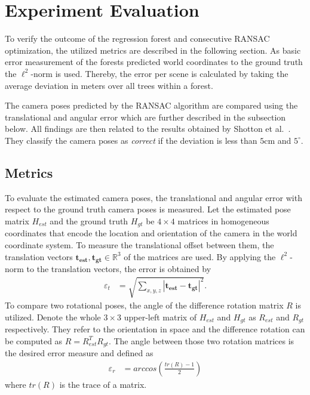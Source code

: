 \documentclass[final]{cvpr}
\begin{document}
\section{Experiment Evaluation} \label{sec:eval}
To verify the outcome of the regression forest and consecutive RANSAC optimization, the utilized metrics are described
in the following section. As basic error measurement of the forests predicted world coordinates to the ground truth the 
$\ell^2$-norm is used. Thereby, the error per scene is calculated by taking the average deviation in meters 
over all trees within a forest. 

The camera poses predicted by the RANSAC algorithm are compared using the translational and angular error 
which are further described in the subsection below. All findings are then related to the results obtained by 
Shotton et al.~\cite{shotton2013}. They classify the camera poses as \textit{correct} if the deviation is less
than $5$cm and $5^\circ$. 


\subsection{Metrics} \label{subsec:metrics}
To evaluate the estimated camera poses, the translational and angular error with respect to the 
ground truth camera poses is measured. Let the estimated pose matrix $H_{est}$ and the ground truth 
$H_{gt}$ be $4 \times 4$ matrices
in homogeneous coordinates that encode the location and orientation of the camera in the world 
coordinate system. To measure the translational offset between them, the translation vectors 
$\boldsymbol{t_{est}}, \boldsymbol{t_{gt}} \in \mathbb{R}^3$ of the matrices are used.
By applying the $\ell^2$-norm to the translation vectors, the error is obtained by
\begin{align}
    \varepsilon_t &= \sqrt{\sum_{x,y,z}|\boldsymbol{t_{est}} - \boldsymbol{t_{gt}}|^2}.
\end{align}
To compare two rotational poses, the angle of the difference rotation matrix $R$ is utilized. 
Denote the whole $3\times3$ upper-left matrix of $H_{est}$ and $H_{gt}$ as $R_{est}$ and 
$R_{gt}$ respectively. They refer to the orientation in space and the difference rotation can be computed 
as $R = R_{est}^TR_{gt}$. The angle between those two rotation matrices is the desired
error measure and defined as
\begin{align}
    \varepsilon_r &= arccos \left( \frac{tr(R)-1}{2} \right)
\end{align}
where $tr(R)$ is the trace of a matrix.
\end{document}
